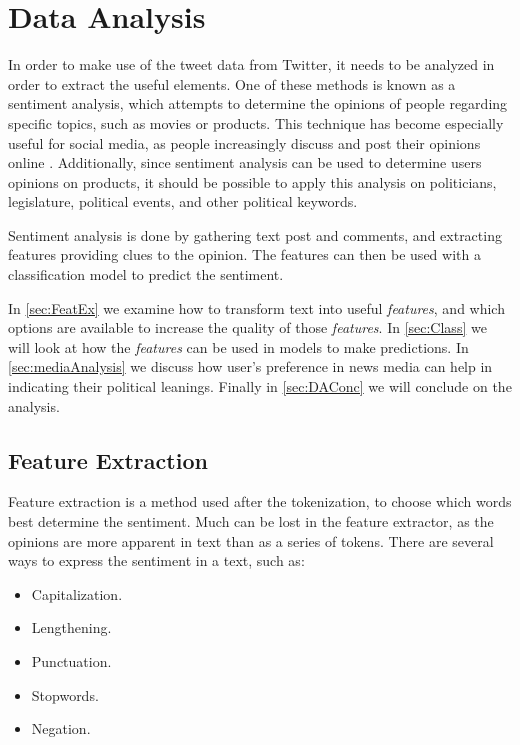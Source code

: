 \chapter{Data Analysis}\label{cha:DA}
In order to make use of the tweet data from Twitter, it needs to be analyzed in
order to extract the useful elements. One of these methods is known as a sentiment
analysis, which attempts to determine the opinions of people regarding specific
topics, such as movies or products. This technique has become especially useful
for social media, as people increasingly discuss and post their opinions online
\citep[Overview 2]{Sentiment}. Additionally, since sentiment analysis can be
used to determine users opinions on products, it should be possible to apply
this analysis on politicians, legislature, political events, and other political
keywords.\nl

Sentiment analysis is done by gathering text post
and comments, and extracting features providing clues to the opinion. The
features can then be used with a classification model to predict the
sentiment.\nl

In \autoref{sec:FeatEx} we examine how to transform text into useful
\textit{features}, and which options are available to increase the quality of
those \textit{features}. In \autoref{sec:Class} we will look at how the
\textit{features} can be used in models to make predictions. In
\autoref{sec:mediaAnalysis} we discuss how user's preference in news media can
help in indicating their political leanings. Finally in \autoref{sec:DAConc} we
will conclude on the analysis.

\section{Feature Extraction}\label{sec:FeatEx}
Feature extraction is a method used after the tokenization, to choose which
words best determine the sentiment. Much can be lost in the feature extractor,
as the opinions are more apparent in text than as a series of tokens. There are
several ways to express the sentiment in a text, such
as\citep[Overview.3-4]{Sentiment}:


\begin{itemize}
  \item Capitalization. 
  \item Lengthening.
  \item Punctuation.
  \item Stopwords.
  \item Negation.
\end{itemize}

